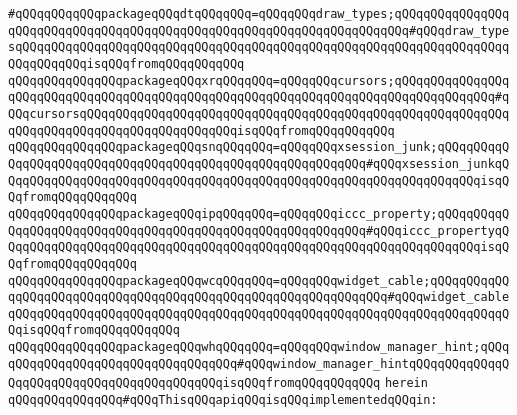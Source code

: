 \verb|#qQQqqQQqqQQqpackageqQQqdtqQQqqQQq=qQQqqQQqdraw_types;qQQqqQQqqQQqqQQqqQQqqQQqqQQqqQQqqQQqqQQqqQQqqQQqqQQqqQQqqQQqqQQqqQQqqQQq#qQQqdraw_typesqQQqqQQqqQQqqQQqqQQqqQQqqQQqqQQqqQQqqQQqqQQqqQQqqQQqqQQqqQQqqQQqqQQqqQQqqQQqqQQqisqQQqfromqQQqqQQqqQQq|\newline
\verb|qQQqqQQqqQQqqQQqpackageqQQqxrqQQqqQQq=qQQqqQQqcursors;qQQqqQQqqQQqqQQqqQQqqQQqqQQqqQQqqQQqqQQqqQQqqQQqqQQqqQQqqQQqqQQqqQQqqQQqqQQqqQQqqQQq#qQQqcursorsqQQqqQQqqQQqqQQqqQQqqQQqqQQqqQQqqQQqqQQqqQQqqQQqqQQqqQQqqQQqqQQqqQQqqQQqqQQqqQQqqQQqqQQqqQQqisqQQqfromqQQqqQQqqQQq|\newline
\verb|qQQqqQQqqQQqqQQqpackageqQQqsnqQQqqQQq=qQQqqQQqxsession_junk;qQQqqQQqqQQqqQQqqQQqqQQqqQQqqQQqqQQqqQQqqQQqqQQqqQQqqQQqqQQq#qQQqxsession_junkqQQqqQQqqQQqqQQqqQQqqQQqqQQqqQQqqQQqqQQqqQQqqQQqqQQqqQQqqQQqqQQqqQQqisqQQqfromqQQqqQQqqQQq|\newline
\verb|qQQqqQQqqQQqqQQqpackageqQQqipqQQqqQQq=qQQqqQQqiccc_property;qQQqqQQqqQQqqQQqqQQqqQQqqQQqqQQqqQQqqQQqqQQqqQQqqQQqqQQqqQQq#qQQqiccc_propertyqQQqqQQqqQQqqQQqqQQqqQQqqQQqqQQqqQQqqQQqqQQqqQQqqQQqqQQqqQQqqQQqqQQqisqQQqfromqQQqqQQqqQQq|\newline
\verb|qQQqqQQqqQQqqQQqpackageqQQqwcqQQqqQQq=qQQqqQQqwidget_cable;qQQqqQQqqQQqqQQqqQQqqQQqqQQqqQQqqQQqqQQqqQQqqQQqqQQqqQQqqQQqqQQq#qQQqwidget_cableqQQqqQQqqQQqqQQqqQQqqQQqqQQqqQQqqQQqqQQqqQQqqQQqqQQqqQQqqQQqqQQqqQQqqQQqisqQQqfromqQQqqQQqqQQq|\newline
\verb|qQQqqQQqqQQqqQQqpackageqQQqwhqQQqqQQq=qQQqqQQqwindow_manager_hint;qQQqqQQqqQQqqQQqqQQqqQQqqQQqqQQqqQQq#qQQqwindow_manager_hintqQQqqQQqqQQqqQQqqQQqqQQqqQQqqQQqqQQqqQQqqQQqisqQQqfromqQQqqQQqqQQq|\newline
\verb|herein|\newline
\newline
\verb|qQQqqQQqqQQqqQQq#qQQqThisqQQqapiqQQqisqQQqimplementedqQQqin:|\newline
